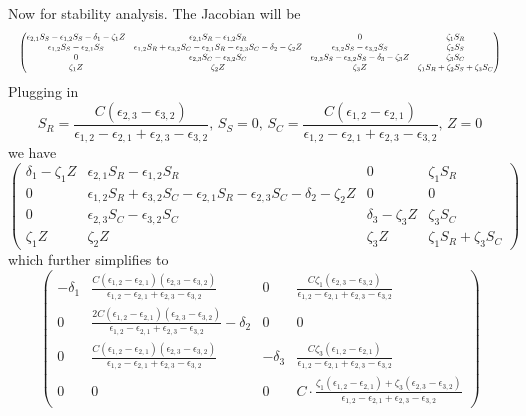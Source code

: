 \documentclass{article}
\begin{document}
Now for stability analysis. The Jacobian will be
\[
    \resizebox{\linewidth}{!}{%
    $\displaystyle
    \begin{pmatrix}
        \epsilon_{2, 1} S_S - \epsilon_{1, 2} S_S - \delta_1 - \zeta_1 Z & \epsilon_{2, 1} S_R - \epsilon_{1, 2} S_R & 0 & \zeta_1 S_R \\
        \epsilon_{1, 2} S_S - \epsilon_{2, 1} S_S & \epsilon_{1, 2} S_R + \epsilon_{3, 2} S_C - \epsilon_{2, 1} S_R - \epsilon_{2, 3} S_C - \delta_2 - \zeta_2 Z & \epsilon_{3, 2} S_S - \epsilon_{3, 2} S_S & \zeta_2 S_S \\
        0 & \epsilon_{2, 3} S_C - \epsilon_{3, 2} S_C & \epsilon_{2, 3} S_S - \epsilon_{3, 2} S_S - \delta_3 - \zeta_3 Z & \zeta_3 S_C \\
        \zeta_1 Z & \zeta_2 Z & \zeta_3 Z & \zeta_1 S_R + \zeta_2 S_S + \zeta_3 S_C
    \end{pmatrix}
    $}
\]
Plugging in
\[
    S_R = \frac{C (\epsilon_{2,3} - \epsilon_{3,2})}{\epsilon_{1,2} - \epsilon_{2,1} + \epsilon_{2,3} - \epsilon_{3,2}},\,
    S_S = 0,\,
    S_C = \frac{C (\epsilon_{1,2} - \epsilon_{2,1})}{\epsilon_{1,2} - \epsilon_{2,1} + \epsilon_{2,3} - \epsilon_{3,2}},\,
    Z = 0
\]
we have
\[
    \begin{pmatrix}
        \delta_1 - \zeta_1 Z & \epsilon_{2, 1} S_R - \epsilon_{1, 2} S_R & 0 & \zeta_1 S_R \\
        0 & \epsilon_{1, 2} S_R + \epsilon_{3, 2} S_C - \epsilon_{2, 1} S_R - \epsilon_{2, 3} S_C - \delta_2 - \zeta_2 Z & 0 & 0 \\
        0 & \epsilon_{2, 3} S_C - \epsilon_{3, 2} S_C & \delta_3 - \zeta_3 Z & \zeta_3 S_C \\
        \zeta_1 Z & \zeta_2 Z & \zeta_3 Z & \zeta_1 S_R + \zeta_3 S_C
    \end{pmatrix}
\]
which further simplifies to
\[
    \begin{pmatrix}
        - \delta_1 & \frac{C (\epsilon_{1, 2} - \epsilon_{2, 1})(\epsilon_{2,3} - \epsilon_{3,2})}{\epsilon_{1,2} - \epsilon_{2,1} + \epsilon_{2,3} - \epsilon_{3,2}} & 0 & \frac{C \zeta_1 (\epsilon_{2,3} - \epsilon_{3,2})}{\epsilon_{1,2} - \epsilon_{2,1} + \epsilon_{2,3} - \epsilon_{3,2}} \\
        0 & \frac{2 C (\epsilon_{1, 2} - \epsilon_{2, 1})(\epsilon_{2,3} - \epsilon_{3,2})}{\epsilon_{1,2} - \epsilon_{2,1} + \epsilon_{2,3} - \epsilon_{3,2}} - \delta_2 & 0 & 0\\
        0 & \frac{C (\epsilon_{1, 2} - \epsilon_{2, 1})(\epsilon_{2,3} - \epsilon_{3,2})}{\epsilon_{1,2} - \epsilon_{2,1} + \epsilon_{2,3} - \epsilon_{3,2}} & - \delta_3 & \frac{C \zeta_3 (\epsilon_{1,2} - \epsilon_{2,1})}{\epsilon_{1,2} - \epsilon_{2,1} + \epsilon_{2,3} - \epsilon_{3,2}} \\
        0 & 0 & 0 & C \cdot \frac{\zeta_1 (\epsilon_{1, 2} - \epsilon_{2, 1}) + \zeta_3 (\epsilon_{2,3} - \epsilon_{3,2})}{\epsilon_{1,2} - \epsilon_{2,1} + \epsilon_{2,3} - \epsilon_{3,2}}
    \end{pmatrix}
\]
\end{document}
